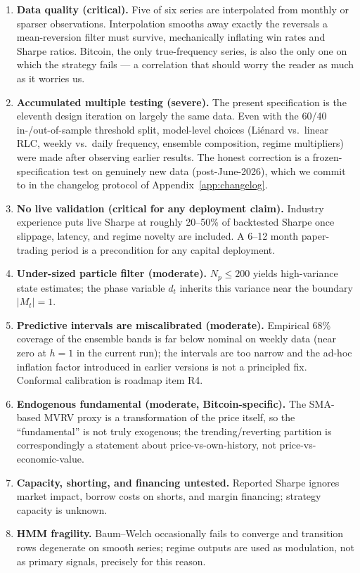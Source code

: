 \documentclass[11pt,a4paper]{article}
\begin{document}
\begin{enumerate}
\item \textbf{Data quality (critical).} Five of six series are interpolated from monthly or sparser observations. Interpolation smooths away exactly the reversals a mean-reversion filter must survive, mechanically inflating win rates and Sharpe ratios. Bitcoin, the only true-frequency series, is also the only one on which the strategy fails --- a correlation that should worry the reader as much as it worries us.
\item \textbf{Accumulated multiple testing (severe).} The present specification is the eleventh design iteration on largely the same data. Even with the 60/40 in-/out-of-sample threshold split, model-level choices (Li\'enard vs.\ linear RLC, weekly vs.\ daily frequency, ensemble composition, regime multipliers) were made after observing earlier results. The honest correction is a frozen-specification test on genuinely new data (post-June-2026), which we commit to in the changelog protocol of Appendix~\ref{app:changelog}.
\item \textbf{No live validation (critical for any deployment claim).} Industry experience puts live Sharpe at roughly 20--50\% of backtested Sharpe once slippage, latency, and regime novelty are included. A 6--12 month paper-trading period is a precondition for any capital deployment.
\item \textbf{Under-sized particle filter (moderate).} $N_p \le 200$ yields high-variance state estimates; the phase variable $d_t$ inherits this variance near the boundary $|M_t| = 1$.
\item \textbf{Predictive intervals are miscalibrated (moderate).} Empirical 68\% coverage of the ensemble bands is far below nominal on weekly data (near zero at $h=1$ in the current run); the intervals are too narrow and the ad-hoc inflation factor introduced in earlier versions is not a principled fix. Conformal calibration is roadmap item R4.
\item \textbf{Endogenous fundamental (moderate, Bitcoin-specific).} The SMA-based MVRV proxy is a transformation of the price itself, so the ``fundamental'' is not truly exogenous; the trending/reverting partition is correspondingly a statement about price-vs-own-history, not price-vs-economic-value.
\item \textbf{Capacity, shorting, and financing untested.} Reported Sharpe ignores market impact, borrow costs on shorts, and margin financing; strategy capacity is unknown.
\item \textbf{HMM fragility.} Baum--Welch occasionally fails to converge and transition rows degenerate on smooth series; regime outputs are used as modulation, not as primary signals, precisely for this reason.
\end{enumerate}
\end{document}
